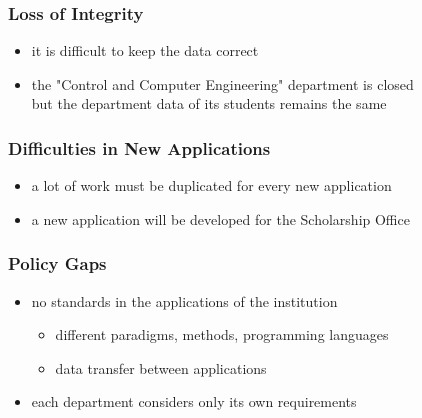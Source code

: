 \documentclass[dvipsnames]{beamer}
\theoremstyle{plain}
\begin{document}
\begin{frame}
  \frametitle{Loss of Integrity}

  \begin{itemize}
    \item it is difficult to keep the data correct
  \end{itemize}

  \pause
  \begin{example}
    \begin{itemize}
      \item the "Control and Computer Engineering" department is closed\\
        but the department data of its students remains the same
    \end{itemize}
  \end{example}
\end{frame}

\begin{frame}
  \frametitle{Difficulties in New Applications}

  \begin{itemize}
    \item a lot of work must be duplicated for every new application
  \end{itemize}

  \pause
  \begin{example}
    \begin{itemize}
      \item a new application will be developed for the Scholarship Office
    \end{itemize}
  \end{example}
\end{frame}

\begin{frame}
  \frametitle{Policy Gaps}

  \begin{itemize}
    \item no standards in the applications of the institution
    \begin{itemize}
      \item different paradigms, methods, programming languages
      \item data transfer between applications
    \end{itemize}

    \pause
    \item each department considers only its own requirements
  \end{itemize}
\end{frame}
\end{document}
